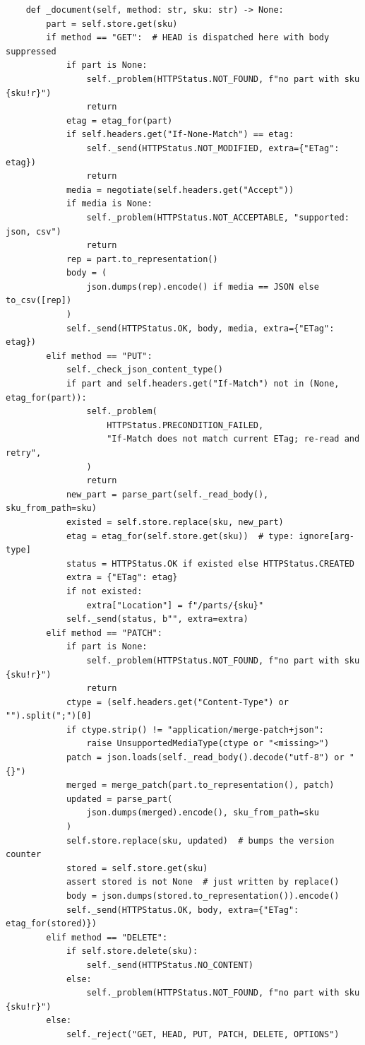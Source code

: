 \begin{verbatim}
    def _document(self, method: str, sku: str) -> None:
        part = self.store.get(sku)
        if method == "GET":  # HEAD is dispatched here with body suppressed
            if part is None:
                self._problem(HTTPStatus.NOT_FOUND, f"no part with sku {sku!r}")
                return
            etag = etag_for(part)
            if self.headers.get("If-None-Match") == etag:
                self._send(HTTPStatus.NOT_MODIFIED, extra={"ETag": etag})
                return
            media = negotiate(self.headers.get("Accept"))
            if media is None:
                self._problem(HTTPStatus.NOT_ACCEPTABLE, "supported: json, csv")
                return
            rep = part.to_representation()
            body = (
                json.dumps(rep).encode() if media == JSON else to_csv([rep])
            )
            self._send(HTTPStatus.OK, body, media, extra={"ETag": etag})
        elif method == "PUT":
            self._check_json_content_type()
            if part and self.headers.get("If-Match") not in (None, etag_for(part)):
                self._problem(
                    HTTPStatus.PRECONDITION_FAILED,
                    "If-Match does not match current ETag; re-read and retry",
                )
                return
            new_part = parse_part(self._read_body(), sku_from_path=sku)
            existed = self.store.replace(sku, new_part)
            etag = etag_for(self.store.get(sku))  # type: ignore[arg-type]
            status = HTTPStatus.OK if existed else HTTPStatus.CREATED
            extra = {"ETag": etag}
            if not existed:
                extra["Location"] = f"/parts/{sku}"
            self._send(status, b"", extra=extra)
        elif method == "PATCH":
            if part is None:
                self._problem(HTTPStatus.NOT_FOUND, f"no part with sku {sku!r}")
                return
            ctype = (self.headers.get("Content-Type") or "").split(";")[0]
            if ctype.strip() != "application/merge-patch+json":
                raise UnsupportedMediaType(ctype or "<missing>")
            patch = json.loads(self._read_body().decode("utf-8") or "{}")
            merged = merge_patch(part.to_representation(), patch)
            updated = parse_part(
                json.dumps(merged).encode(), sku_from_path=sku
            )
            self.store.replace(sku, updated)  # bumps the version counter
            stored = self.store.get(sku)
            assert stored is not None  # just written by replace()
            body = json.dumps(stored.to_representation()).encode()
            self._send(HTTPStatus.OK, body, extra={"ETag": etag_for(stored)})
        elif method == "DELETE":
            if self.store.delete(sku):
                self._send(HTTPStatus.NO_CONTENT)
            else:
                self._problem(HTTPStatus.NOT_FOUND, f"no part with sku {sku!r}")
        else:
            self._reject("GET, HEAD, PUT, PATCH, DELETE, OPTIONS")



\end{verbatim}
